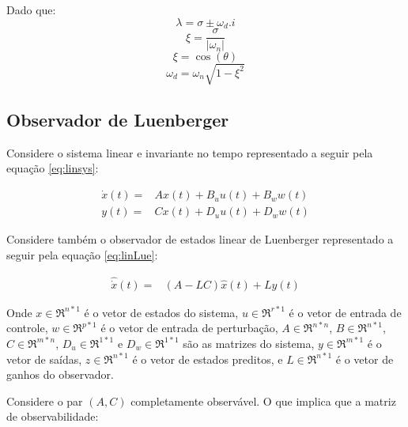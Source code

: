 Dado que:
\begin{equation} \label{eq:eign}
        \lambda = \sigma \pm \omega_d.i
\end{equation}
\begin{equation} \label{eq:xi}
    \xi=\frac{\sigma}{|\omega_n|}
\end{equation}
\begin{equation} \label{eq:theta}
        \xi=\cos{(\theta)}
\end{equation}
\begin{equation} \label{eq:wd}
        \omega_d=\omega_n\sqrt{1-\xi^2}
\end{equation}
    
\subsection{Observador de Luenberger}\label{sc:luemberger}

Considere o sistema linear e invariante no tempo representado a seguir pela equação \ref{eq:linsys}:

\begin{equation}\label{eq:linsys}
    \begin{split}
        \dot{x}(t)=&Ax(t)+B_uu(t)+B_ww(t)\\
              y(t)=&Cx(t)+D_uu(t)+D_ww(t)
    \end{split}
\end{equation}

Considere também o observador de estados linear de Luenberger representado a seguir pela equação \ref{eq:linLue}: 

\begin{equation}\label{eq:linLue}
    \begin{split}
        \hat{\dot{x}}(t)=&(A-LC)\hat{x}(t) + Ly(t) 
    \end{split}
\end{equation}

Onde $x \in \Re^{n*1}$ é o vetor de estados do sistema, $u \in \Re^{r*1}$ é o vetor de entrada de controle, $w \in \Re^{p*1}$ é o vetor de entrada de perturbação, $A \in \Re^{n*n}$, $B \in \Re^{n*1}$, $C \in \Re^{m*n}$, $D_u \in \Re^{1*1}$ e $D_w \in \Re^{1*1}$ são as matrizes do sistema, $y \in \Re^{m*1}$ é o vetor de saídas, $z \in \Re^{n*1}$ é o vetor de estados preditos, e $L\in \Re^{n*1}$ é o vetor de ganhos do observador.

Considere o par $(A,C)$ completamente observável. O que implica que a matriz de observabilidade:

